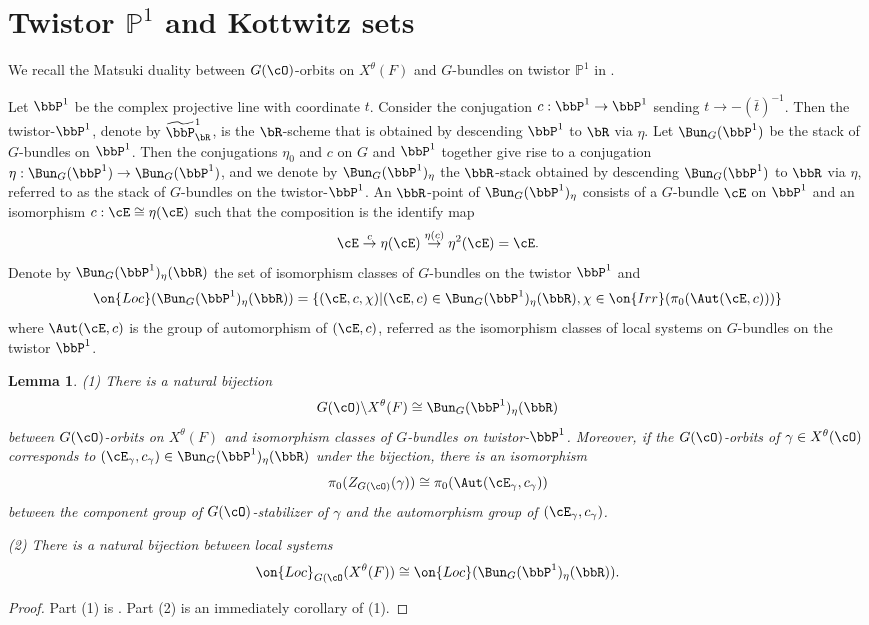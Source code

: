 \documentclass[12pt]{amsart}
\newtheorem{lem}[thm]{Lemma}
\theoremstyle{remark}
\begin{document}
\section{Twistor $\mathbb P^1$ and Kottwitz sets}\label{Tw}
We recall the Matsuki duality between
$G(\cO)$-orbits on $X^\theta(F)$
and $G$-bundles on twistor $\mathbb P^1$ in \cite{CY}.

Let $\bbP^1$ be the complex projective line with coordinate $t$. Consider the conjugation $c:\bbP^1\to\bbP^1$ sending $t\to -(\bar t)^{-1}$.
Then the twistor-$\bbP^1$, denote by $\widetilde\bbP^1_{\bR}$, is the $\bR$-scheme 
that is obtained by descending $\bbP^1$ to $\bR$ via $\eta$. 
Let $\Bun_G(\bbP^1)$ be the stack of $G$-bundles on $\bbP^1$. Then the conjugations $\eta_0$
and $c$ on $G$ and $\bbP^1$ together give rise to
a conjugation $\eta:\Bun_G(\bbP^1)\to \Bun_G(\bbP^1)$,
and we denote by 
$\Bun_G(\bbP^1)_\eta$ the $\bbR$-stack obtained by descending $\Bun_G(\bbP^1)$ to $\bbR$ via $\eta$, referred to as the stack of $G$-bundles on the twistor-$\bbP^1$.
An $\bbR$-point of $\Bun_G(\bbP^1)_\eta$ consists of 
a $G$-bundle $\cE$ on $\bbP^1$ 
and an isomorphism $c:\cE\cong\eta(\cE)$ 
such that the composition is the identify map
\begin{equation}\label{c^2}
    \cE\stackrel{c}\to\eta(\cE)\stackrel{\eta(c)}\to 
    \eta^2(\cE)=\cE.
\end{equation}
Denote by $\Bun_G(\bbP^1)_\eta(\bbR)$ the set of isomorphism classes of $G$-bundles on the twistor $\bbP^1$
and 
\[\on{Loc}(\Bun_G(\bbP^1)_\eta(\bbR))=\{(\cE,c,\chi)|(\cE,c)\in\Bun_G(\bbP^1)_\eta(\bbR), \chi\in\on{Irr}(\pi_0(\Aut(\cE,c)))\}\]
where $\Aut(\cE,c)$ is the group of automorphism of $(\cE,c)$, referred as the isomorphism classes of local systems on $G$-bundles 
on the twistor $\bbP^1$.
  

\begin{lem}\label{review of Matsuki}
(1)
There is a natural bijection 
\[G(\cO)\backslash X^\theta(F)\cong \Bun_G(\bbP^1)_\eta(\bbR)\]
between $G(\cO)$-orbits on $X^\theta(F)$
and isomorphism classes of $G$-bundles on twistor-$\bbP^1$. 
Moreover, if the $G(\cO)$-orbits of 
$\gamma\in X^\theta(\cO)$ corresponds to 
$(\cE_\gamma,c_\gamma)\in \Bun_G(\bbP^1)_\eta(\bbR)$ under the bijection, there is an isomorphism 
\[\pi_0(Z_{G(\cO)}(\gamma))\cong\pi_0(\Aut(\cE_\gamma,c_\gamma))\]
between the component group of $G(\cO)$-stabilizer of $\gamma$ and the automorphism group of $(\cE_\gamma,c_\gamma)$.

(2) There is a natural  bijection between local systems
\[\on{Loc}_{G(\cO}(X^\theta(F))\cong\on{Loc}(\Bun_G(\bbP^1)_\eta(\bbR)).\]
\end{lem}
\begin{proof}
 Part (1) is \cite[Theorem 4 and Theorem 22]{CY}. Part (2) is an immediately corollary of (1).
\end{proof}
\end{document}
